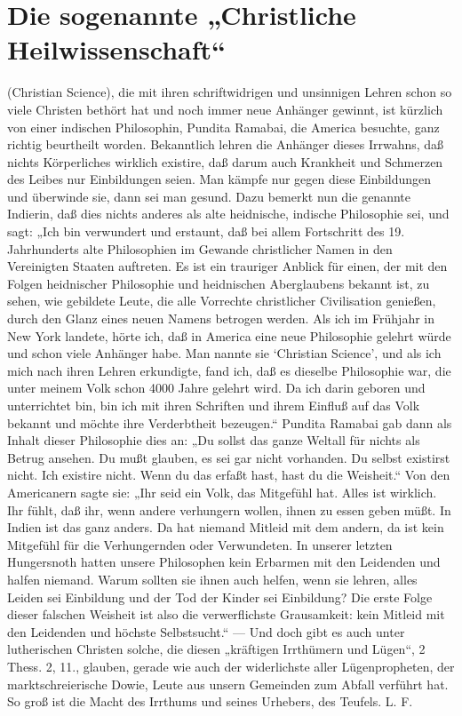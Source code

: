 \chapter[Christliche Heilwissenschaft]{Die sogenannte „Christliche Heilwissenschaft“}
(Christian Science), die mit ihren schriftwidrigen und unsinnigen Lehren schon so viele Christen bethört hat und noch immer neue Anhänger gewinnt, ist kürzlich von einer indischen Philosophin, Pundita Ramabai, die America besuchte, ganz richtig beurtheilt worden. Bekanntlich lehren die Anhänger dieses Irrwahns, daß nichts Körperliches wirklich existire, daß darum auch Krankheit und Schmerzen des Leibes nur Einbildungen seien. Man kämpfe nur gegen diese Einbildungen und überwinde sie, dann sei man gesund. Dazu bemerkt nun die genannte Indierin, daß dies nichts anderes als alte heidnische, indische Philosophie sei, und sagt: „Ich bin verwundert und erstaunt, daß bei allem Fortschritt des 19. Jahrhunderts alte Philosophien im Gewande christlicher Namen in den Vereinigten Staaten auftreten. Es ist ein trauriger Anblick für einen, der mit den Folgen heidnischer Philosophie und heidnischen Aberglaubens bekannt ist, zu sehen, wie gebildete Leute, die alle Vorrechte christlicher Civilisation genießen, durch den Glanz eines neuen Namens betrogen werden. Als ich im Frühjahr in New York landete, hörte ich, daß in America eine neue Philosophie gelehrt würde und schon viele Anhänger habe. Man nannte sie ‘Christian Science’, und als ich mich nach ihren Lehren erkundigte, fand ich, daß es dieselbe Philosophie war, die unter meinem Volk schon 4000 Jahre gelehrt wird. Da ich darin geboren und unterrichtet bin, bin ich mit ihren Schriften und ihrem Einfluß auf das Volk bekannt und möchte ihre Verderbtheit bezeugen.“ Pundita Ramabai gab dann als Inhalt dieser Philosophie dies an: „Du sollst das ganze Weltall für nichts als Betrug ansehen. Du mußt glauben, es sei gar nicht vorhanden. Du selbst existirst nicht. Ich existire nicht. Wenn du das erfaßt hast, hast du die Weisheit.“ Von den Americanern sagte sie: „Ihr seid ein Volk, das Mitgefühl hat. Alles ist wirklich. Ihr fühlt, daß ihr, wenn andere verhungern wollen, ihnen zu essen geben müßt. In Indien ist das ganz anders. Da hat niemand Mitleid mit dem andern, da ist kein Mitgefühl für die Verhungernden oder Verwundeten. In unserer letzten Hungersnoth hatten unsere Philosophen kein Erbarmen mit den Leidenden und halfen niemand. Warum sollten sie ihnen auch helfen, wenn sie lehren, alles Leiden sei Einbildung und der Tod der Kinder sei Einbildung? Die erste Folge dieser falschen Weisheit ist also die verwerflichste Grausamkeit: kein Mitleid mit den Leidenden und höchste Selbstsucht.“ — Und doch gibt es auch unter lutherischen Christen solche, die diesen „kräftigen Irrthümern und Lügen“, 2 Thess. 2, 11., glauben, gerade wie auch der widerlichste aller Lügenpropheten, der marktschreierische Dowie, Leute aus unsern Gemeinden zum Abfall verführt hat. So groß ist die Macht des Irrthums und seines Urhebers, des Teufels. L. F.
